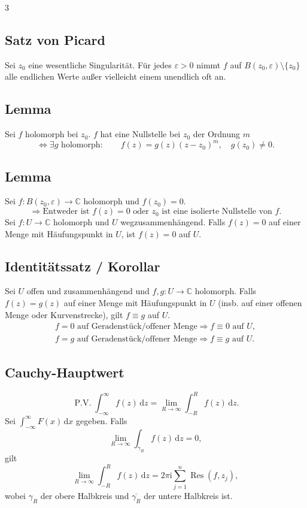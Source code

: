 \documentclass[a4paper,landscape]{article}
\newcommand{\C}{\mathbb C}
\newcommand{\dd}{\,\mathrm d}
\newcommand{\ii}{\mathrm i}
\DeclareMathOperator{\Res}{Res}
\DeclareMathOperator{\PV}{P.V.}
\begin{document}
\begin{multicols*}{3}
\subsection*{Satz von Picard}
Sei $z_0$ eine wesentliche Singularität. Für jedes $\varepsilon>0$ nimmt $f$ auf $B(z_0,\varepsilon)\setminus\{z_0\}$ alle endlichen Werte außer vielleicht einem unendlich oft an.

\subsection*{Lemma}
Sei $f$ holomorph bei $z_0$. $f$ hat eine Nullstelle bei $z_0$ der Ordnung $m$
\[
\Leftrightarrow \exists g\text{ holomorph}:\qquad f(z)=g(z)(z-z_0)^m,\quad g(z_0)\ne0.
\]

\subsection*{Lemma}
Sei $f:B(z_0,\varepsilon)\to\C$ holomorph und $f(z_0)=0$.
\[
\Rightarrow \text{Entweder ist } f(z)=0\text{ oder }z_0\text{ ist eine isolierte Nullstelle von }f.
\]
Sei $f:U\to\C$ holomorph und $U$ wegzusammenhängend. Falls $f(z)=0$ auf einer Menge mit Häufungspunkt in $U$,
ist $f(z)=0$ auf $U$.

\subsection*{Identitätssatz / Korollar}
Sei $U$ offen und zusammenhängend und $f,g:U\to\C$ holomorph. Falls $f(z)=g(z)$ auf einer Menge mit Häufungspunkt in $U$
(insb. auf einer offenen Menge oder Kurvenstrecke), gilt $f\equiv g$ auf $U$.
\[
\begin{gathered}
f=0\text{ auf Geradenstück/offener Menge}\Rightarrow f\equiv0\text{ auf }U,\\
f=g\text{ auf Geradenstück/offener Menge}\Rightarrow f\equiv g\text{ auf }U.
\end{gathered}
\]

\subsection*{Cauchy-Hauptwert}
\[
\PV\int_{-\infty}^{\infty}f(z)\dd z=\lim_{R\to\infty}\int_{-R}^{R}f(z)\dd z.
\]
Sei $\displaystyle\int_{-\infty}^{\infty}F(x)\dd x$ gegeben. Falls
\[
\lim_{R\to\infty}\int_{\gamma_R} f(z)\dd z=0,
\]
gilt
\[
\lim_{R\to\infty}\int_{-R}^{R}f(z)\dd z=2\pi\ii\sum_{j=1}^{n}\Res(f,z_j),
\]
wobei $\gamma_R$ der obere Halbkreis und $\overline{\gamma_R}$ der untere Halbkreis ist.


\end{multicols*}
\end{document}
